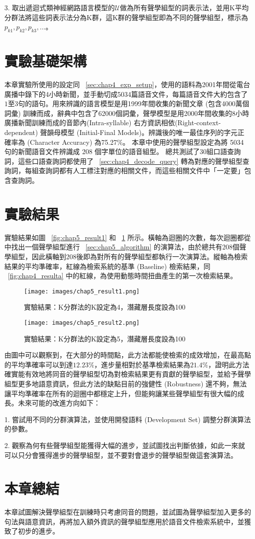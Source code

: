 3. 取出遞迴式類神經網路語言模型的$\mathcal{U}$做為所有聲學組型的詞表示法，並用K平均分群法將這些詞表示法分為K群，這K群的聲學組型即為不同的聲學組型，標示為$p_{k1}, p_{k2}, p_{k3}, ...$。


\section{實驗基礎架構}
本章實驗所使用的設定同 ~\ref{sec:chap4_exp_setup}，使用的語料為2001年間從電台廣播中錄下的4小時新聞，並手動切成5034篇語音文件，每篇語音文件大約包含了$1至3$句的語句。用來辨識的語言模型是用1999年間收集的新聞文章 (包含4000萬個詞彙)
訓練而成，辭典中包含了62000個詞彙，聲學模型是用2000年間收集的8小時廣播新聞訓練而成的音節內(Intra-syllable) 右方資訊相依(Right-context-dependent) 聲韻母模型 (Initial-Final Models)。辨識後的唯一最佳序列的字元正確率為 (Character Accuracy) 為75.27\%。
本章中使用的聲學組型設定為將 5034 句的新聞語音文件辨識成 208 個字單位的語音組型。
總共測試了30組口語查詢詞，這些口語查詢詞都使用了 ~\ref{sec:chap4_decode_query} 轉為對應的聲學組型查詢詞，每組查詢詞都有人工標注對應的相關文件，而這些相關文件中「一定要」包含查詢詞。

\section{實驗結果}
實驗結果如圖 ~\ref{fig:chap5_result1} 和 ~\ref{fig:chap5_result2} 所示。橫軸為迴圈的次數，每次迴圈都從中找出一個聲學組型進行 ~\ref{sec:chap5_algorithm} 的演算法，由於總共有208個聲學組型，因此橫軸到208後即為對所有的聲學組型都執行一次演算法。縱軸為檢索結果的平均準確率，紅線為檢索系統的基準 (Baseline) 檢索結果，同 ~\ref{fig:chap4_resulta} 中的紅線，為使用動態時間扭曲產生的第一次檢索結果。 

\begin{figure}
\centering
\texttt{[image: images/chap5\_result1.png]}
\caption{實驗結果：K分群法的K設定為4，潛藏層長度設為100} \label{fig:chap5_result1}
\texttt{[image: images/chap5\_result2.png]}
\caption{實驗結果：K分群法的K設定為5，潛藏層長度設為100} \label{fig:chap5_result2}
\end{figure}

由圖中可以觀察到，在大部分的時間點，此方法都能使檢索的成效增加，在最高點的平均準確率可以到達$12.23\%$，進步量相對於基準檢索結果為$21.4\%$，證明此方法確實能有效地將同音的聲學組型切為對檢索結果更有貢獻的聲學組型，並給予聲學組型更多地語意資訊，但此方法的缺點目前的強健性 (Robustness) 還不夠，無法讓平均準確率在所有的迴圈中都穩定上升，但能夠讓某些聲學組型有很大幅的成長。未來可能的改進方向如下：

1. 嘗試用不同的分群演算法，並使用開發語料 (Development Set) 調整分群演算法的參數。

2. 觀察為何有些聲學組型能獲得大幅的進步，並試圖找出判斷依據，如此一來就可以只分會獲得進步的聲學組型，並不要對會退步的聲學組型做這套演算法。

\section{本章總結}
本章試圖解決聲學組型在訓練時只考慮同音的問題，並試圖為聲學組型加入更多的句法與語意資訊，再將加入額外資訊的聲學組型應用於語音文件檢索系統中，並獲致了初步的進步。
